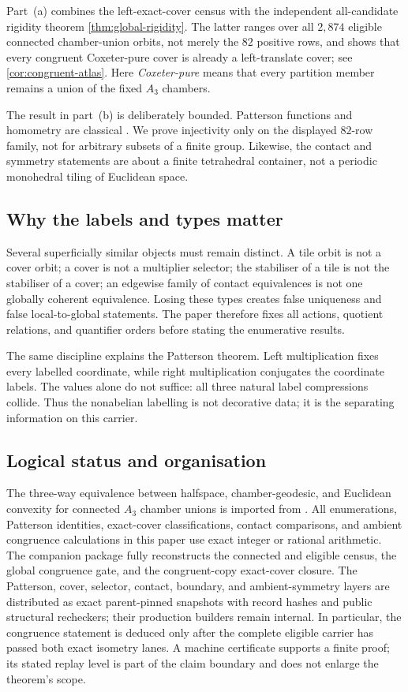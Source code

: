 Part~(a) combines the left-exact-cover census with the independent
all-candidate rigidity theorem \cref{thm:global-rigidity}.  The latter ranges
over all $2{,}874$ eligible connected chamber-union orbits, not merely the
$82$ positive rows, and shows that every congruent Coxeter-pure cover is
already a left-translate cover; see \cref{cor:congruent-atlas}.  Here
\emph{Coxeter-pure} means that every partition member remains a union of the
fixed $A_3$ chambers.

The result in part~(b) is deliberately bounded.  Patterson functions and
homometry are classical \cite{MandereauEtAl2011,RosenblattSeymour1982,
GenuysPopoff2018}.  We prove injectivity only on the displayed $82$-row
family, not for arbitrary subsets of a finite group.  Likewise, the contact
and symmetry statements are about a finite tetrahedral container, not a
periodic monohedral tiling of Euclidean space.

\subsection{Why the labels and types matter}

Several superficially similar objects must remain distinct.  A tile orbit is
not a cover orbit; a cover is not a multiplier selector; the stabiliser of a
tile is not the stabiliser of a cover; an edgewise family of contact
equivalences is not one globally coherent equivalence.  Losing these types
creates false uniqueness and false local-to-global statements.  The paper
therefore fixes all actions, quotient relations, and quantifier orders before
stating the enumerative results.

The same discipline explains the Patterson theorem.  Left multiplication
fixes every labelled coordinate, while right multiplication conjugates the
coordinate labels.  The values alone do not suffice: all three natural label
compressions collide.  Thus the nonabelian labelling is not decorative data;
it is the separating information on this carrier.

\subsection{Logical status and organisation}

The three-way equivalence between halfspace, chamber-geodesic, and Euclidean
convexity for connected $A_3$ chamber unions is imported from
\cite{BabanskyyT2}.  All enumerations, Patterson identities, exact-cover
classifications, contact comparisons, and ambient congruence calculations in
this paper use exact integer or rational arithmetic.  The companion package
fully reconstructs the connected and eligible census, the global congruence
gate, and the congruent-copy exact-cover closure.  The Patterson, cover,
selector, contact, boundary, and ambient-symmetry layers are distributed as
exact parent-pinned snapshots with record hashes and public structural
recheckers; their production builders remain internal.  In particular, the
congruence statement is deduced only after the complete eligible carrier has
passed both exact isometry lanes.  A machine certificate supports a finite
proof; its stated replay level is part of the claim boundary and does not
enlarge the theorem's scope.

